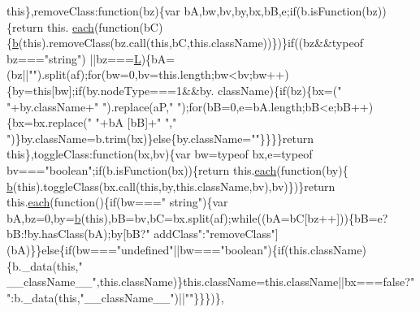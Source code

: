 \begin{DoxyCode}
{      this}\},removeClass:\textcolor{keyword}{function}(bz)\{var bA,bw,bv,by,bx,bB,e;\textcolor{keywordflow}{if}(b.isFunction(bz))\{\textcolor{keywordflow}{return} this.
      \hyperlink{jquery_8js_a871ff39db627c54c710a3e9909b8234c}{each}(\textcolor{keyword}{function}(bC)\{\hyperlink{jquery_8js_aa4026ad5544b958e54ce5e106fa1c805}{b}(\textcolor{keyword}{this}).removeClass(bz.call(\textcolor{keyword}{this},bC,\textcolor{keyword}{this}.className))\})\}\textcolor{keywordflow}{if}((bz&&typeof bz===\textcolor{stringliteral}{"string"})
      ||bz===\hyperlink{jquery_8js_a38ee4c0b5f4fe2a18d0c783af540d253}{L})\{bA=(bz||\textcolor{stringliteral}{""}).split(af);\textcolor{keywordflow}{for}(bw=0,bv=this.length;bw<bv;bw++)\{by=\textcolor{keyword}{this}[bw];\textcolor{keywordflow}{if}(by.nodeType===1&&by.
      className)\{\textcolor{keywordflow}{if}(bz)\{bx=(\textcolor{stringliteral}{" "}+by.className+\textcolor{stringliteral}{" "}).replace(aP,\textcolor{stringliteral}{" "});\textcolor{keywordflow}{for}(bB=0,e=bA.length;bB<e;bB++)\{bx=bx.replace(\textcolor{stringliteral}{" "}+bA
      [bB]+\textcolor{stringliteral}{" "},\textcolor{stringliteral}{" "})\}by.className=b.trim(bx)\}\textcolor{keywordflow}{else}\{by.className=\textcolor{stringliteral}{""}\}\}\}\}\textcolor{keywordflow}{return} \textcolor{keyword}{this}\},toggleClass:\textcolor{keyword}{function}(bx,bv)\{var 
      bw=typeof bx,e=typeof bv===\textcolor{stringliteral}{"boolean"};\textcolor{keywordflow}{if}(b.isFunction(bx))\{\textcolor{keywordflow}{return} this.\hyperlink{jquery_8js_a871ff39db627c54c710a3e9909b8234c}{each}(\textcolor{keyword}{function}(by)\{
      \hyperlink{jquery_8js_aa4026ad5544b958e54ce5e106fa1c805}{b}(\textcolor{keyword}{this}).toggleClass(bx.call(\textcolor{keyword}{this},by,\textcolor{keyword}{this}.className,bv),bv)\})\}\textcolor{keywordflow}{return} this.\hyperlink{jquery_8js_a871ff39db627c54c710a3e9909b8234c}{each}(\textcolor{keyword}{function}()\{\textcolor{keywordflow}{if}(bw===\textcolor{stringliteral}{"
      string"})\{var bA,bz=0,by=\hyperlink{jquery_8js_aa4026ad5544b958e54ce5e106fa1c805}{b}(\textcolor{keyword}{this}),bB=bv,bC=bx.split(af);\textcolor{keywordflow}{while}((bA=bC[bz++]))\{bB=e?bB:!by.hasClass(bA);by[bB?\textcolor{stringliteral}{"
      addClass"}:\textcolor{stringliteral}{"removeClass"}](bA)\}\}\textcolor{keywordflow}{else}\{\textcolor{keywordflow}{if}(bw===\textcolor{stringliteral}{"undefined"}||bw===\textcolor{stringliteral}{"boolean"})\{\textcolor{keywordflow}{if}(this.className)\{b.\_data(\textcolor{keyword}{this},\textcolor{stringliteral}{"
      \_\_className\_\_"},this.className)\}this.className=this.className||bx===\textcolor{keyword}{false}?\textcolor{stringliteral}{""}:b.\_data(\textcolor{keyword}{this},\textcolor{stringliteral}{"\_\_className\_\_"})||\textcolor{stringliteral}{""}\}\}\})\},

\end{DoxyCode}
